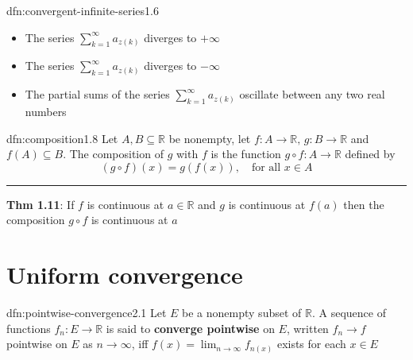 \documentclass[landscape, 8pt]{extarticle}
\begin{document}
\begin{multicols}{3}
\begin{dfn}{dfn:convergent-infinite-series}{1.6}
\begin{itemize}[leftmargin=*]
		\item The series $\sum_{k=1}^{\infty} a_{z(k)}$ diverges to $+\infty$

		\item The series $\sum_{k=1}^{\infty} a_{z(k)}$ diverges to $-\infty$

		\item The partial sums of the series $\sum_{k=1}^{\infty} a_{z(k)}$ oscillate between any two real numbers

	\end{itemize}

\end{dfn}



%

\vspace{-5pt}
\begin{dfn}[Composition]{dfn:composition}{1.8}
	Let $A, B \subseteq \mathbb{R}$ be nonempty, let $f : A \to \mathbb{R},\, g : B \to \mathbb{R}$ and $f(A) \subseteq B$. The composition of $g$ with $f$ is the function $g \circ f : A \to \mathbb{R}$ defined by
	\[(g \circ f)(x) = g(f(x)), \quad \text{for all $x\in A$}\]

	\vspace{-5pt}
	\noindent\rule{\textwidth}{0.2pt}

	\textbf{Thm 1.11}: If $f$ is continuous at $a\in \mathbb{R}$ and $g$ is continuous at $f(a)$ then the composition $g \circ f$ is continuous at $a$
\end{dfn}

\newpage
\vspace{-15pt}
\section{Uniform convergence}

\begin{dfn}{dfn:pointwise-convergence}{2.1}
	Let $E$ be a nonempty subset of $\mathbb{R}$. A sequence of functions $f_{n}: E\to \mathbb{R}$ is said to \textbf{converge pointwise} on $E$, written $f_{n}\to f$ pointwise on $E$ as $n\to \infty$, iff $f(x) = \displaystyle\lim_{n \to \infty}f_{n(x)}$ exists for each $x \in E$


\end{dfn}
\end{multicols}
\end{document}
